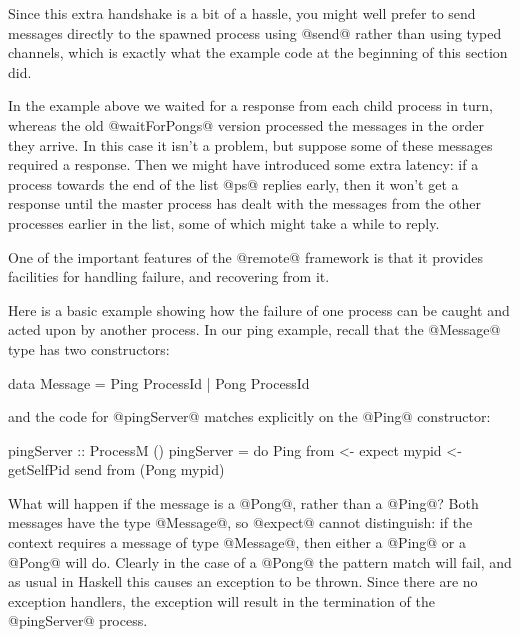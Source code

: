 Since this extra handshake is a bit of a hassle, you might well prefer
to send messages directly to the spawned process using @send@ rather
than using typed channels, which is exactly what the example code at the
beginning of this section did.



In the example above we waited for a response from each child process
in turn, whereas the old @waitForPongs@ version processed the messages
in the order they arrive.  In this case it isn't a problem, but
suppose some of these messages required a response.  Then we might
have introduced some extra latency: if a process towards the end of
the list @ps@ replies early, then it won't get a response until the
master process has dealt with the messages from the other processes
earlier in the list, some of which might take a while to reply.



One of the important features of the @remote@ framework is that it
provides facilities for handling failure, and recovering from it.

Here is a basic example showing how the failure of one process can be
caught and acted upon by another process.  In our ping example, recall
that the @Message@ type has two constructors:

\begin{haskell}
data Message = Ping ProcessId
             | Pong ProcessId
\end{haskell}

\noindent and the code for @pingServer@ matches explicitly on the
@Ping@ constructor:

\begin{haskell}
pingServer :: ProcessM ()
pingServer = do
  Ping from <- expect
  mypid <- getSelfPid
  send from (Pong mypid)
\end{haskell}

\noindent What will happen if the message is a @Pong@, rather than a
@Ping@?  Both messages have the type @Message@, so @expect@ cannot
distinguish: if the context requires a message of type @Message@, then
either a @Ping@ or a @Pong@ will do.  Clearly in the case of a @Pong@
the pattern match will fail, and as usual in Haskell this causes an
exception to be thrown.  Since there are no exception handlers, the
exception will result in the termination of the @pingServer@ process.

